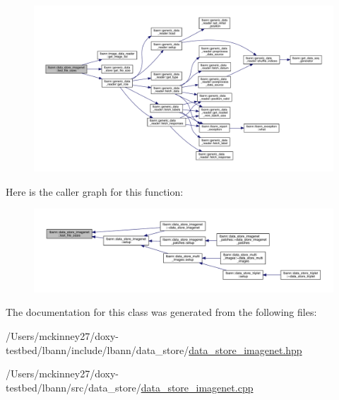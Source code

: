 \begin{figure}[H]
\begin{center}
\leavevmode
\includegraphics[width=350pt]{classlbann_1_1data__store__imagenet_a1c928ccfb4e75ffe4cefd62f37c072f8_cgraph}
\end{center}
\end{figure}
Here is the caller graph for this function\+:\nopagebreak
\begin{figure}[H]
\begin{center}
\leavevmode
\includegraphics[width=350pt]{classlbann_1_1data__store__imagenet_a1c928ccfb4e75ffe4cefd62f37c072f8_icgraph}
\end{center}
\end{figure}


The documentation for this class was generated from the following files\+:\begin{DoxyCompactItemize}
\item 
/\+Users/mckinney27/doxy-\/testbed/lbann/include/lbann/data\+\_\+store/\hyperlink{data__store__imagenet_8hpp}{data\+\_\+store\+\_\+imagenet.\+hpp}\item 
/\+Users/mckinney27/doxy-\/testbed/lbann/src/data\+\_\+store/\hyperlink{data__store__imagenet_8cpp}{data\+\_\+store\+\_\+imagenet.\+cpp}\end{DoxyCompactItemize}
